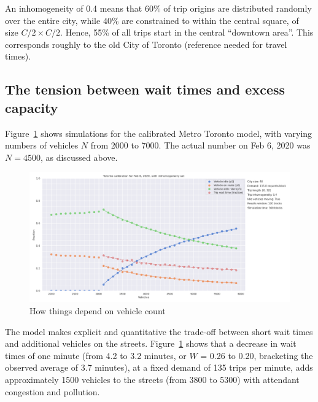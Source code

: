 \documentclass[
  letterpaper,
]{article}
\begin{document}
An inhomogeneity of 0.4 means that 60\% of trip origins are distributed
randomly over the entire city, while 40\% are constrained to within the
central square, of size \(C/2 \times C/2\). Hence, 55\% of all trips
start in the central ``downtown area''. This corresponds roughly to the
old City of Toronto (reference needed for travel times).

\hypertarget{the-tension-between-wait-times-and-excess-capacity}{%
\subsection{The tension between wait times and excess
capacity}\label{the-tension-between-wait-times-and-excess-capacity}}

Figure~\ref{fig-toronto-final} shows simulations for the calibrated
Metro Toronto model, with varying numbers of vehicles \(N\) from 2000 to
7000. The actual number on Feb 6, 2020 was \(N=4500\), as discussed
above.

\begin{figure}

{\centering \includegraphics{toronto_vehicle_count.png}

}

\caption{\label{fig-toronto-final}How things depend on vehicle count}

\end{figure}

The model makes explicit and quantitative the trade-off between short
wait times and additional vehicles on the streets.
Figure~\ref{fig-toronto-final} shows that a decrease in wait times of
one minute (from 4.2 to 3.2 minutes, or \(W\) = 0.26 to 0.20, bracketing
the observed average of 3.7 minutes), at a fixed demand of 135 trips per
minute, adds approximately 1500 vehicles to the streets (from 3800 to
5300) with attendant congestion and pollution.
\end{document}
